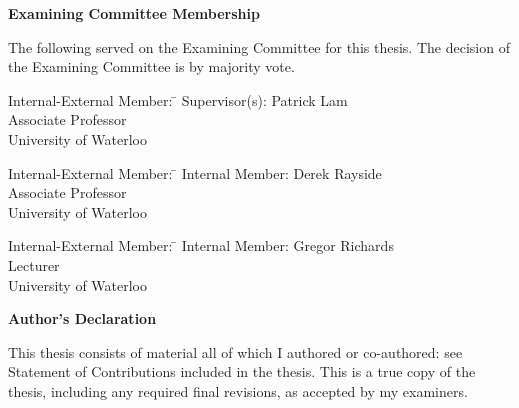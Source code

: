 \cleardoublepage %

 
\begin{center}\textbf{Examining Committee Membership}\end{center}
  \noindent
The following served on the Examining Committee for this thesis. The decision of the Examining Committee is by majority vote.
  \bigskip
  
  \noindent
\begin{tabbing}
Internal-External Member: \=  \kill %
Supervisor(s): \> Patrick Lam \\
\> Associate Professor \\
\> University of Waterloo \\
\end{tabbing}
  \bigskip
  
  \noindent
  \begin{tabbing}
Internal-External Member: \=  \kill %
Internal Member: \> Derek Rayside \\
\> Associate Professor \\
\> University of Waterloo \\
\end{tabbing}
  \bigskip
  
  \noindent
\begin{tabbing}
Internal-External Member: \=  \kill %
Internal Member: \> Gregor Richards \\
\> Lecturer \\
\> University of Waterloo \\
\end{tabbing}
  \bigskip

\cleardoublepage

 \begin{center}\textbf{Author's Declaration}\end{center}
  
 \noindent
This thesis consists of material all of which I authored or co-authored: see Statement of Contributions included in the thesis. This is a true copy of the thesis, including any required final revisions, as accepted by my examiners.
  \bigskip
  
